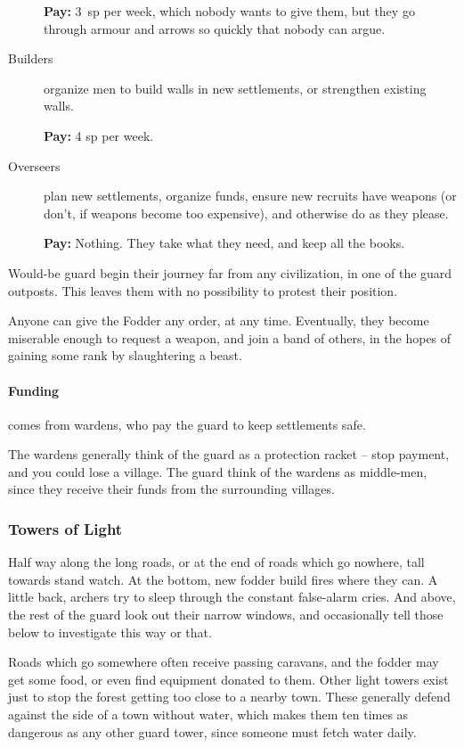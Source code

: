 \begin{multicols}{2}
\begin{description}
  \textbf{Pay:} 3~\gls{sp} per week, which nobody wants to give them, but they go through armour and arrows so quickly that nobody can argue.

  \item[Builders]
  organize men to build walls in new settlements, or strengthen existing walls.

  \textbf{Pay:} 4 \gls{sp} per week.

  \item[Overseers]
  plan new settlements, organize funds, ensure new recruits have weapons (or don't, if weapons become too expensive), and otherwise do as they please.

  \textbf{Pay:} Nothing.
  They take what they need, and keep all the books.

\end{description}

\noindent
Would-be \gls{guard} begin their journey far from any civilization, in one of the \gls{guard} outposts.
This leaves them with no possibility to protest their position.

Anyone can give the Fodder any order, at any time.
Eventually, they become miserable enough to request a weapon, and join a band of others, in the hopes of gaining some rank by slaughtering a beast.

\paragraph{Funding}
comes from wardens, who pay the guard to keep settlements safe.

The wardens generally think of the \gls{guard} as a protection racket -- stop payment, and you could lose a village.
The \gls{guard} think of the wardens as middle-men, since they receive their funds from the surrounding villages.

\subsubsection{Towers of Light}
Half way along the long roads, or at the end of roads which go nowhere, tall towards stand watch.
At the bottom, new fodder build fires where they can.
A little back, archers try to sleep through the constant false-alarm cries.
And above, the rest of the guard look out their narrow windows, and occasionally tell those below to investigate this way or that.

Roads which go somewhere often receive passing caravans, and the fodder may get some food, or even find equipment donated to them.
Other light towers exist just to stop the forest getting too close to a nearby town.
These generally defend against the side of a town without water, which makes them ten times as dangerous as any other \gls{guard} tower, since someone must fetch water daily.


\end{multicols}
